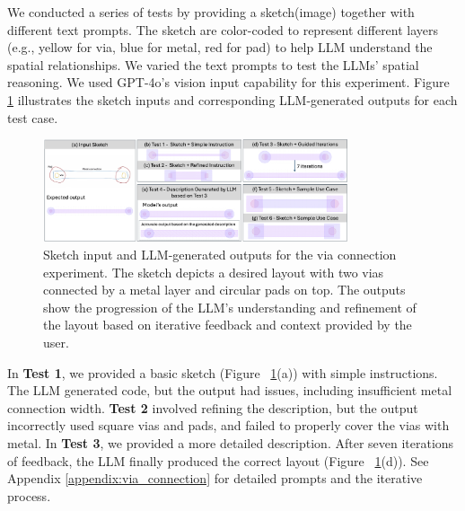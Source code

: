 \documentclass{article}
\begin{document}
We conducted a series of tests by providing a sketch(image) together with different text prompts. The sketch are color-coded to represent different layers (e.g., yellow for via, blue for metal, red for pad) to help LLM understand the spatial relationships. We varied the text prompts to test the LLMs' spatial reasoning. We used GPT-4o's vision input capability for this experiment. Figure \ref{fig:via_experiment} illustrates the sketch inputs and corresponding LLM-generated outputs for each test case.
\begin{figure}[h]
\centering
\includegraphics[width=0.8\textwidth]{Figure1_v5.png}
\caption{Sketch input and LLM-generated outputs for the via connection experiment. The sketch depicts a desired layout with two vias connected by a metal layer and circular pads on top. The outputs show the progression of the LLM's understanding and refinement of the layout based on iterative feedback and context provided by the user.}
\label{fig:via_experiment}
\end{figure}
In \textbf{Test 1}, we provided a basic sketch (Figure ~\ref{fig:via_experiment}(a)) with simple instructions. The LLM generated code, but the output had issues, including insufficient metal connection width. \textbf{Test 2} involved refining the description, but the output incorrectly used square vias and pads, and failed to properly cover the vias with metal. In \textbf{Test 3}, we provided a more detailed description. After seven iterations of feedback, the LLM finally produced the correct layout (Figure ~\ref{fig:via_experiment}(d)). See Appendix \ref{appendix:via_connection} for detailed prompts and the iterative process.
\end{document}
